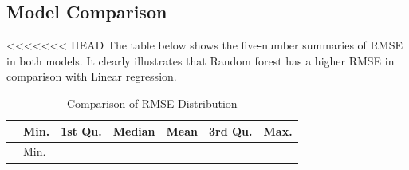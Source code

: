 \documentclass[
]{article}
\begin{document}
\subsection{Model Comparison}\label{model-comparison}

\textless\textless\textless\textless\textless\textless\textless{} HEAD
The table below shows the five-number summaries of RMSE in both models.
It clearly illustrates that Random forest has a higher RMSE in
comparison with Linear regression.

\begin{longtable}[]{@{}
  >{\raggedright\arraybackslash}p{}
  >{\raggedleft\arraybackslash}p{}
  >{\raggedleft\arraybackslash}p{}
  >{\raggedleft\arraybackslash}p{}
  >{\raggedleft\arraybackslash}p{}
  >{\raggedleft\arraybackslash}p{}
  >{\raggedleft\arraybackslash}p{}@{}}
\caption{Comparison of RMSE Distribution}\tabularnewline
\toprule\noalign{}
\begin{minipage}[b]{\linewidth}\raggedright
\end{minipage} & \begin{minipage}[b]{\linewidth}\raggedleft
Min.
\end{minipage} & \begin{minipage}[b]{\linewidth}\raggedleft
1st Qu.
\end{minipage} & \begin{minipage}[b]{\linewidth}\raggedleft
Median
\end{minipage} & \begin{minipage}[b]{\linewidth}\raggedleft
Mean
\end{minipage} & \begin{minipage}[b]{\linewidth}\raggedleft
3rd Qu.
\end{minipage} & \begin{minipage}[b]{\linewidth}\raggedleft
Max.
\end{minipage} \\
\midrule\noalign{}
\endfirsthead
\toprule\noalign{}
\begin{minipage}[b]{\linewidth}\raggedright
\end{minipage} & \begin{minipage}[b]{\linewidth}\raggedleft
Min.
\end{minipage} & \begin{minipage}[b]{\linewidth}\raggedleft

\end{minipage}
\end{longtable}
\end{document}
